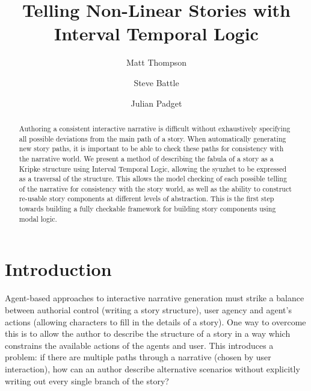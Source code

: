 \documentclass{llncs}
\begin{document}

\title{Telling Non-Linear Stories with Interval Temporal Logic}

\author{Matt Thompson \and Steve Battle \and Julian Padget }

\maketitle



\begin{abstract}
Authoring a consistent interactive narrative is difficult without exhaustively specifying all possible deviations from the main path of a story. When automatically generating new story paths, it is important to be able to check these paths for consistency with the narrative world.
We present a method of describing the fabula of a story as a Kripke structure using Interval Temporal Logic, allowing the syuzhet to be expressed as a traversal of the structure. This allows the model checking of each possible telling of the narrative for consistency with the story world, as well as the ability to construct re-usable story components at different levels of abstraction. This is the first step towards building a fully checkable framework for building story components using modal logic.
\end{abstract}

\section{Introduction}
Agent-based approaches to interactive narrative generation must strike a balance between authorial control (writing a story structure), user agency and agent's actions (allowing characters to fill in the details of a story). One way to overcome this is to allow the author to describe the structure of a story in a way which constrains the available actions of the agents and user.
This introduces a problem: if there are multiple paths through a narrative (chosen by user interaction), how can an author describe alternative scenarios without explicitly writing out every single branch of the story? 
\end{document}
